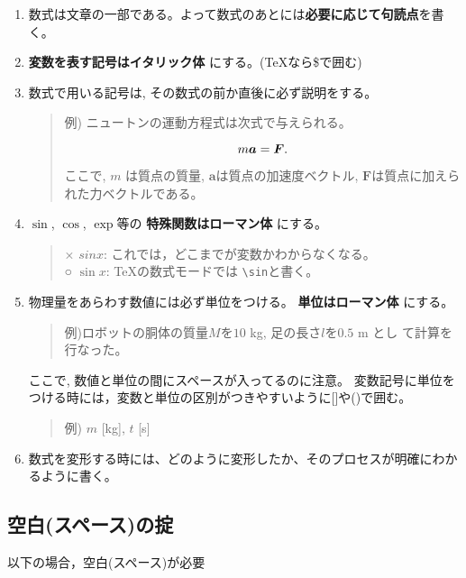 \documentclass[12pt, ]{jsarticle}
\begin{document}
\begin{enumerate}
\item
  数式は文章の一部である。よって数式のあとには\textbf{必要に応じて句読点}を書く。
\item
  \textbf{変数を表す記号はイタリック体} にする。(TeXなら\$で囲む)
\item
  数式で用いる記号は, その数式の前か直後に必ず説明をする。

  \begin{quote}
  例) ニュートンの運動方程式は次式で与えられる。

  \[m\boldsymbol{a}=\boldsymbol{F}.\noindent\]

  ここで, \(m\) は質点の質量, \(\boldsymbol{a}\)は質点の加速度ベクトル,
  \(\boldsymbol{F}\)は質点に加えられた力ベクトルである。
  \end{quote}
\item
  \(\sin\), \(\cos\), \(\exp\)等の \textbf{特殊関数はローマン体}
  にする。

  \begin{quote}
  × \(sin x\): これでは，どこまでが変数かわからなくなる。\\
  ○ \(\sin x\): TeXの数式モードでは \lstinline!\sin!と書く。
  \end{quote}
\item
  物理量をあらわす数値には必ず単位をつける。 \textbf{単位はローマン体}
  にする。

  \begin{quote}
  例)ロボットの胴体の質量\(M\)を\(10\) kg, 足の長さ\(l\)を\(0.5\) m とし
  て計算を行なった。
  \end{quote}

  ここで, 数値と単位の間にスペースが入ってるのに注意。
  変数記号に単位をつける時には，変数と単位の区別がつきやすいように{[}{]}や()で囲む。

  \begin{quote}
  例) \(m\) {[}kg{]}, \(t\) {[}s{]}
  \end{quote}
\item
  数式を変形する時には、どのように変形したか、そのプロセスが明確にわかるように書く。
\end{enumerate}

\subsection{空白(スペース)の掟}\label{ux7a7aux767dux30b9ux30daux30fcux30b9ux306eux639f}

以下の場合，空白(スペース)が必要
\end{document}

